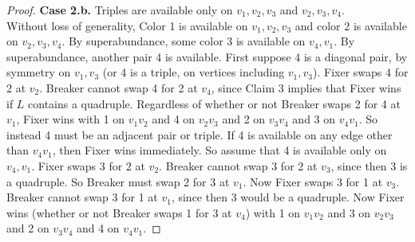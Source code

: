 \documentclass[12pt,reqno]{amsart}
\theoremstyle{plain}
\theoremstyle{definition}
\theoremstyle{remark}
\begin{document}
\begin{proof}
\noindent
\textbf{Case 2.b.} 
Triples are available only on $v_1,v_2,v_3$ and $v_2,v_3,v_4$.\\
Without loss of generality, Color 1 is available on $v_1,v_2,v_3$ and color 2
is available on $v_2,v_3,v_4$.  
By superabundance, some color 3 is available on $v_4,v_1$.  By
superabundance, another pair 4 is available.  First suppose 4 is a diagonal
pair, by symmetry on $v_1,v_3$ (or 4 is a triple, on vertices including
$v_1,v_3$).  Fixer swaps 4 for 2 at $v_2$.  Breaker cannot
swap 4 for 2 at $v_4$, since Claim 3 implies that Fixer wins if $L$ contains a
quadruple.  Regardless of whether or not Breaker swaps 2 for 4 at $v_1$, Fixer
wins with 1 on $v_1v_2$ and 4 on $v_2v_3$ and 2 on $v_3v_4$ and 3 on $v_4v_1$. 
So instead 4 must be an adjacent pair or triple.  If 4 is available on any edge
other than $v_4v_1$, then Fixer wins immediately.  So assume that 4 is
available only on $v_4,v_1$.
Fixer swaps 3 for 2 at $v_2$.  Breaker cannot swap 3 for 2 at $v_3$, since then
3 is a quadruple.  So Breaker must swap 2 for 3 at $v_1$.  Now Fixer swaps 3 for
1 at $v_3$.  Breaker cannot swap 3 for 1 at $v_1$, since then 3 would be a
quadruple.  Now Fixer wins (whether or not Breaker swaps 1 for 3 at $v_4$) with
1 on $v_1v_2$ and 3 on $v_2v_3$ and 2 on $v_3v_4$ and 4 on $v_4v_1$.


\end{proof}
\end{document}

